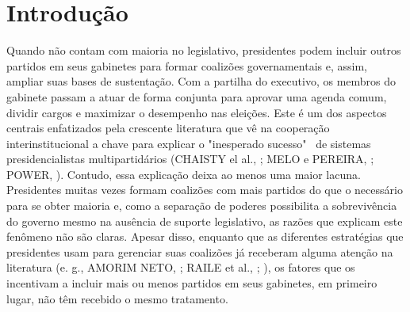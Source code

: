 \chapter{Introdução}
\label{chap:introduction}

Quando não contam com maioria no legislativo, presidentes podem incluir outros partidos em seus gabinetes para formar coalizões governamentais e, assim, ampliar suas bases de sustentação. Com a partilha do executivo, os membros do gabinete passam a atuar de forma conjunta para aprovar uma agenda comum, dividir cargos e maximizar o desempenho nas eleições. Este é um dos aspectos centrais enfatizados pela crescente literatura que vê na cooperação interinstitucional a chave para explicar o "inesperado sucesso"~ de sistemas presidencialistas multipartidários (CHAISTY el al., \citeyear{chaisty2014}; MELO e PEREIRA, \citeyear{melo2013}; POWER, \citeyear{power2010}). Contudo, essa explicação deixa ao menos uma maior lacuna. Presidentes muitas vezes formam coalizões com mais partidos do que o necessário para se obter maioria e, como a separação de poderes possibilita a sobrevivência do governo mesmo na ausência de suporte legislativo, as razões que explicam este fenômeno não são claras. Apesar disso, enquanto que as diferentes estratégias que presidentes usam para gerenciar suas coalizões já receberam alguma atenção na literatura (e. g., AMORIM NETO, \citeyear{neto2006}; RAILE et al., \citeyear{raile2010}; ), os fatores que os incentivam a incluir mais ou menos partidos em seus gabinetes, em primeiro lugar, não têm recebido o mesmo tratamento.

